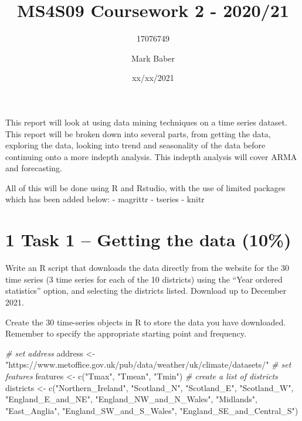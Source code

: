 \documentclass[
]{article}
\title{MS4S09 Coursework 2 - 2020/21}
\subtitle{17076749}
\author{Mark Baber}
\date{xx/xx/2021}
\newenvironment{Shaded}{\begin{snugshade}}{\end{snugshade}}
\newcommand{\CommentTok}[1]{\textcolor[rgb]{0.56,0.35,0.01}{\textit{#1}}}
\newcommand{\FunctionTok}[1]{\textcolor[rgb]{0.00,0.00,0.00}{#1}}
\newcommand{\NormalTok}[1]{#1}
\newcommand{\OtherTok}[1]{\textcolor[rgb]{0.56,0.35,0.01}{#1}}
\newcommand{\StringTok}[1]{\textcolor[rgb]{0.31,0.60,0.02}{#1}}
\begin{document}
\maketitle

This report will look at using data mining techniques on a time series
dataset. This report will be broken down into several parts, from
getting the data, exploring the data, looking into trend and seasonality
of the data before continuing onto a more indepth analysis. This indepth
analysis will cover ARMA and forecasting.

All of this will be done using R and Rstudio, with the use of limited
packages which has been added below: - magrittr - tseries - knitr

\hypertarget{task-1-getting-the-data-10}{%
\section{1 Task 1 -- Getting the data
(10\%)}\label{task-1-getting-the-data-10}}

Write an R script that downloads the data directly from the website for
the 30 time series (3 time series for each of the 10 districts) using
the ``Year ordered statistics'' option, and selecting the districts
listed. Download up to December 2021.

Create the 30 time-series objects in R to store the data you have
downloaded. Remember to specify the appropriate starting point and
frequency.

\begin{Shaded}
\begin{Highlighting}[]
\CommentTok{\# set address}
\NormalTok{address }\OtherTok{\textless{}{-}} \StringTok{"https://www.metoffice.gov.uk/pub/data/weather/uk/climate/datasets/"}
\CommentTok{\# set features}
\NormalTok{features }\OtherTok{\textless{}{-}} \FunctionTok{c}\NormalTok{(}\StringTok{"Tmax"}\NormalTok{, }\StringTok{"Tmean"}\NormalTok{, }\StringTok{"Tmin"}\NormalTok{)}
\CommentTok{\# create a list of districts}
\NormalTok{districts }\OtherTok{\textless{}{-}} \FunctionTok{c}\NormalTok{(}\StringTok{"Northern\_Ireland"}\NormalTok{,}
                  \StringTok{"Scotland\_N"}\NormalTok{,}
                  \StringTok{"Scotland\_E"}\NormalTok{,}
                  \StringTok{"Scotland\_W"}\NormalTok{,}
                  \StringTok{"England\_E\_and\_NE"}\NormalTok{,}
                  \StringTok{"England\_NW\_and\_N\_Wales"}\NormalTok{,}
                  \StringTok{"Midlands"}\NormalTok{,}
                  \StringTok{"East\_Anglia"}\NormalTok{,}
                  \StringTok{"England\_SW\_and\_S\_Wales"}\NormalTok{,}
                  \StringTok{"England\_SE\_and\_Central\_S"}\NormalTok{)}
\end{Highlighting}
\end{Shaded}
\end{document}
